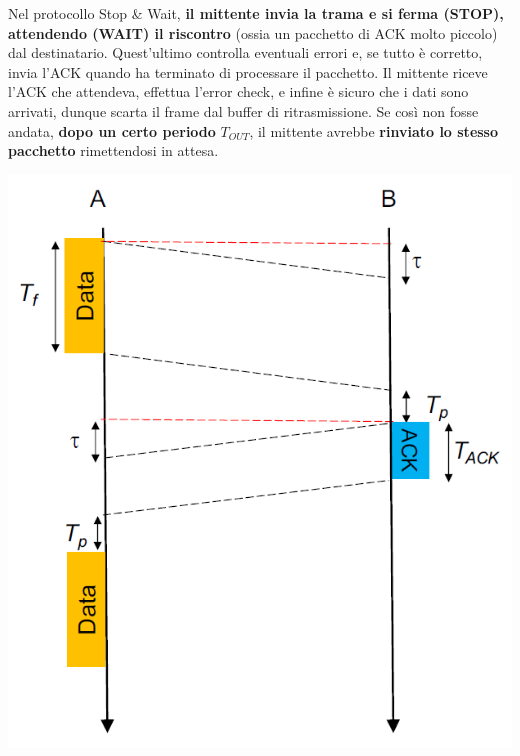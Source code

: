 \documentclass[12pt]{article}
\begin{document}
Nel protocollo Stop \& Wait, \textbf{il mittente invia la trama e si ferma (STOP), attendendo (WAIT) il riscontro} (ossia un pacchetto di ACK molto piccolo) dal destinatario. Quest'ultimo controlla eventuali errori e, se tutto è corretto, invia l'ACK quando ha terminato di processare il pacchetto. Il mittente riceve l'ACK che attendeva, effettua l'error check, e infine è sicuro che i dati sono arrivati, dunque scarta il frame dal buffer di ritrasmissione. Se così non fosse andata, \textbf{dopo un certo periodo} $T_{OUT}$, il mittente avrebbe \textbf{rinviato lo stesso pacchetto} rimettendosi in attesa.
\begin{center}
    \includegraphics[scale=0.3]{stop_and_wait}

\end{center}
\end{document}

